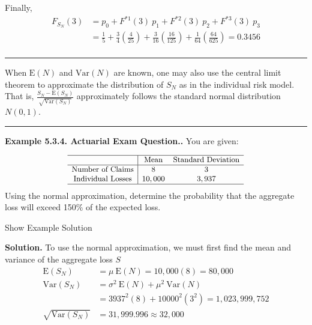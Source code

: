 \documentclass[]{book}
\theoremstyle{definition}
\theoremstyle{definition}
\theoremstyle{definition}
\theoremstyle{remark}
\begin{document}
Finally, \[\begin{aligned}
F_{S_N}(3) &= p_0 + F^{\ast 1}(3) \ p_1 + F^{\ast 2}(3) \ p_2 + F^{\ast 3}(3) \ p_3 \\
&= \frac{1}{5} + \frac{3}{4}\left(\frac{4}{25} \right) + \frac{3}{16} \left( \frac{16}{125} \right) + \frac{1}{64} \left( \frac{64}{625}\right) = 0.3456\\
\end{aligned}\]

\begin{center}\rule{0.5\linewidth}{\linethickness}\end{center}

When \(\mathrm{E}(N)\) and \(\mathrm{Var}(N)\) are known, one may also
use the central limit theorem to approximate the distribution of \(S_N\)
as in the individual risk model. That is,
\(\frac{S_N - \mathrm{E}(S_N)}{\sqrt{\mathrm{Var}(S_N)}}\) approximately
follows the standard normal distribution \(N(0,1)\).

\begin{center}\rule{0.5\linewidth}{\linethickness}\end{center}

\textbf{Example 5.3.4. Actuarial Exam Question..} You are given:

\[
{\small 
\begin{matrix}
  \begin{array}{ c | c  c }
    \hline
      & \text{Mean} & \text{Standard Deviation}\\ \hline
    \text{Number of Claims} & 8 & 3\\
    \text{Individual Losses} & 10,000 & 3,937\\
    \hline
  \end{array}
\end{matrix}
}
\] Using the normal approximation, determine the probability that the
aggregate loss will exceed 150\(\%\) of the expected loss.

Show Example Solution

\hypertarget{toggleExampleAggLoss.3.4}{}
\textbf{Solution.} To use the normal approximation, we must first find
the mean and variance of the aggregate loss \(S\) \[\begin{aligned}
\mathrm{E}(S_N) &= \mu \ \mathrm{E}(N) = 10,000(8) = 80,000\\
\mathrm{Var}(S_N) &= \sigma^2 \ \mathrm{E}(N) + \mu^2 \ \mathrm{Var}(N)\\
&= 3937^2(8) + 10000^2 (3^2) = 1,023,999,752\\
\sqrt{\mathrm{Var}(S_N)} &= 31,999.996 \approx 32,000
\end{aligned}\]
\end{document}
